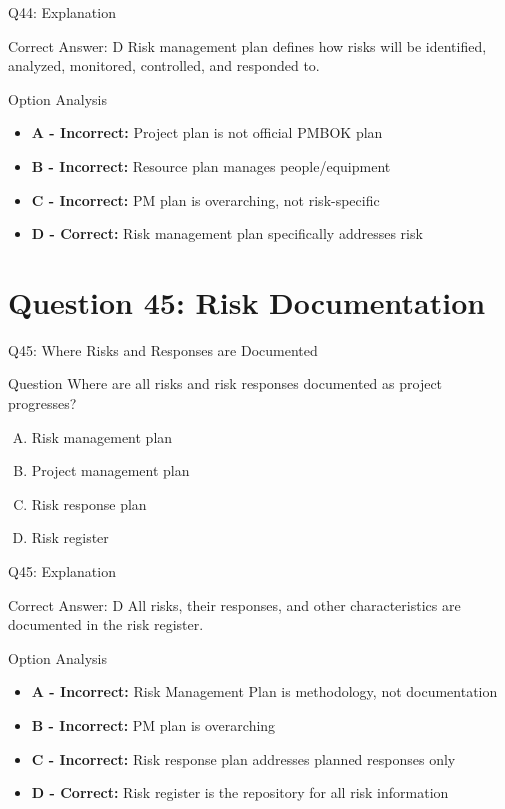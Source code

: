 \documentclass{beamer}
\begin{document}
	\begin{frame}{Q44: Explanation}
		\begin{block}{Correct Answer: D}
			Risk management plan defines how risks will be identified, analyzed, monitored, controlled, and responded to.
		\end{block}
		\begin{block}{Option Analysis}
			\begin{itemize}
				\item \textbf{A - Incorrect:} Project plan is not official PMBOK plan
				\item \textbf{B - Incorrect:} Resource plan manages people/equipment
				\item \textbf{C - Incorrect:} PM plan is overarching, not risk-specific
				\item \textbf{D - Correct:} Risk management plan specifically addresses risk
			\end{itemize}
		\end{block}
	\end{frame}
	
	\section{Question 45: Risk Documentation}
	
	\begin{frame}{Q45: Where Risks and Responses are Documented}
		\begin{block}{Question}
			Where are all risks and risk responses documented as project progresses?
		\end{block}
		\begin{enumerate}[(A)]
			\item Risk management plan
			\item Project management plan
			\item Risk response plan
			\item Risk register
		\end{enumerate}
	\end{frame}
	
	\begin{frame}{Q45: Explanation}
		\begin{block}{Correct Answer: D}
			All risks, their responses, and other characteristics are documented in the risk register.
		\end{block}
		\begin{block}{Option Analysis}
			\begin{itemize}
				\item \textbf{A - Incorrect:} Risk Management Plan is methodology, not documentation
				\item \textbf{B - Incorrect:} PM plan is overarching
				\item \textbf{C - Incorrect:} Risk response plan addresses planned responses only
				\item \textbf{D - Correct:} Risk register is the repository for all risk information
			\end{itemize}
		\end{block}
	\end{frame}
	
\end{document}
